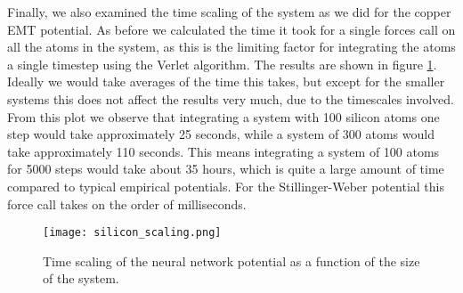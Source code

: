 Finally, we also examined the time scaling of the system as we did for the
copper EMT potential.
As before we calculated the time it took for a single forces call
on all the atoms in the system, as this is the limiting
factor for integrating the atoms a single timestep using the
Verlet algorithm.
The results are shown in figure \ref{fig:silicon-scaling}.
Ideally we would take averages of the time this takes, but except
for the smaller systems this does not affect the results very much,
due to the timescales involved.
From this plot we observe that integrating a system
with 100 silicon atoms one step would take approximately
25 seconds, while a system of 300 atoms would take approximately
110 seconds. This means integrating a system of 100 atoms
for 5000 steps would take about 35 hours, which is quite
a large amount of time compared to typical empirical potentials.
For the Stillinger-Weber potential this force call
takes on the order of milliseconds.

\begin{figure}
    \centering
    \texttt{[image: silicon\_scaling.png]}
    \caption{Time scaling of the neural network potential
        as a function of the size of the system.}
    \label{fig:silicon-scaling}
\end{figure}

